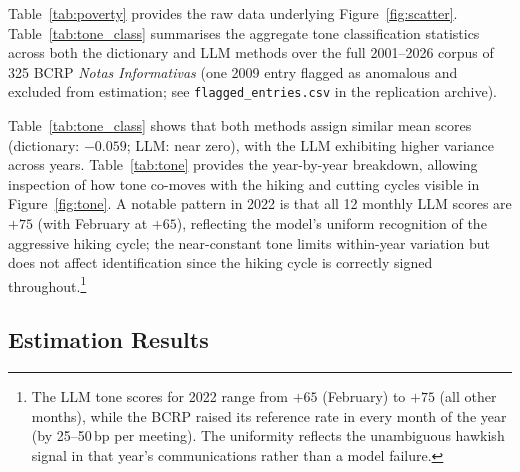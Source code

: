 \documentclass[12pt,letterpaper]{article}
\newenvironment{mytable}[2]{%
  \begin{table}[H]
  \centering
  \caption{#1}
  \label{#2}
  \begin{threeparttable}
}{%
  \end{threeparttable}
  \end{table}
}
\begin{document}
\begin{mytable}{Annual GDP Growth and Poverty Data, 2005--2024}{tab:poverty}
  
\end{mytable}

Table~\ref{tab:poverty} provides the raw data underlying Figure~\ref{fig:scatter}.
Table~\ref{tab:tone_class} summarises the aggregate tone classification
statistics across both the dictionary and LLM methods over the full 2001--2026
corpus of 325 BCRP \textit{Notas Informativas} (one 2009 entry flagged as anomalous and excluded from estimation; see \texttt{flagged\_entries.csv} in the replication archive).

\begin{mytable}{BCRP Communication Tone: Summary Statistics}{tab:tone_class}
  
\end{mytable}

Table~\ref{tab:tone_class} shows that both methods assign similar mean scores
(dictionary: $-0.059$; LLM: near zero), with the LLM exhibiting higher
variance across years. Table~\ref{tab:tone} provides the year-by-year
breakdown, allowing inspection of how tone co-moves with the hiking and
cutting cycles visible in Figure~\ref{fig:tone}. A notable pattern in 2022 is
that all 12 monthly LLM scores are $+75$ (with February at $+65$), reflecting
the model's uniform recognition of the aggressive hiking cycle; the near-constant
tone limits within-year variation but does not affect identification since the
hiking cycle is correctly signed throughout.\footnote{The LLM tone scores for
  2022 range from $+65$ (February) to $+75$ (all other months), while the
  BCRP raised its reference rate in every month of the year (by 25--50\,bp per
  meeting). The uniformity reflects the unambiguous hawkish signal in that
  year's communications rather than a model failure.}

\begin{mytable}{BCRP Communication Tone by Year, 2001--2026}{tab:tone}
  
\end{mytable}

\subsection*{Estimation Results}

\begin{mytable}{VAR(1) Companion Matrix $\hat{A}_1$}{tab:var_coefs}
  
\end{mytable}
\end{document}
